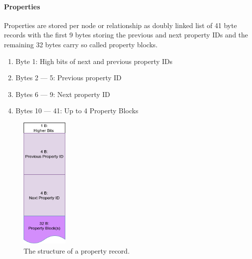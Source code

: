             \paragraph{Properties}
                Properties are stored per node or relationship as doubly linked list of 41 byte records with the first 9 bytes storing the previous and next property IDs and the remaining 32 bytes carry so called property blocks.
                \begin{enumerate}
                \item Byte 1: High bits of next and previous property IDs
                \item Bytes 2 --- 5: Previous property ID
                \item Bytes 6 --- 9: Next property ID
                \item Bytes 10 --- 41: Up to 4 Property Blocks
                \end{enumerate}
                
                \begin{figure}[htp]\label{prop}
                    \begin{center}
                        \includegraphics[keepaspectratio,height=0.2\textheight,width=0.2\textwidth]{img/03_record/property/property.png}
                    \end{center}
                    \caption{The structure of a property record.} %
                \end{figure}
                
